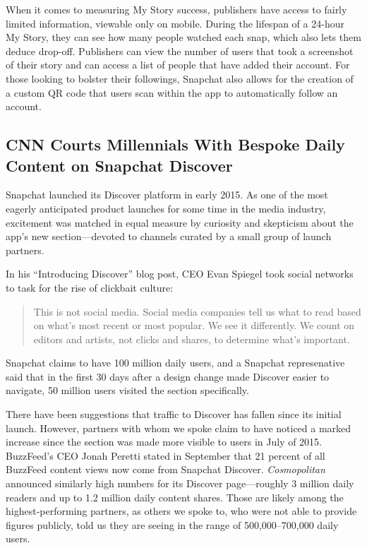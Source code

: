 \documentclass[notoc, symmetric, nobib, nols]{towcenter-guideto-book}
\begin{document}
When it comes to measuring My Story success, publishers have access to fairly limited information, viewable only on mobile. During the lifespan of a 24-hour My Story, they can see how many people watched each snap, which also lets them deduce drop-off. Publishers can view the number of users that took a screenshot of their story and can access a list of people that have added their account. For those looking to bolster their followings, Snapchat also allows for the creation of a custom QR code that users scan within the app to automatically follow an account.

\subsection{CNN Courts Millennials With Bespoke Daily Content on Snapchat Discover}

Snapchat launched its Discover platform in early 2015.\autocite{SnapchatDiscover} As one of the most eagerly anticipated product launches for some time in the media industry, excitement was matched in equal measure by curiosity and skepticism about the app's new section---devoted to channels curated by a small group of launch partners.

In his ``Introducing Discover'' blog post, CEO Evan Spiegel took social networks to task for the rise of clickbait culture: 

\begin{quote}
This is not social media. Social media companies tell us what to read based on what's most recent or most popular. We see it differently. We count on editors and artists, not clicks and shares, to determine what's important.\autocite{SnapchatDiscover}
\end{quote}

Snapchat claims to have 100 million daily users, and a Snapchat represenative said that in the first 30 days after a design change made Discover easier to navigate, 50 million users visited the section specifically.\autocite{DigidaySnapchat}

There have been suggestions that traffic to Discover has fallen since its initial launch. However, partners with whom we spoke claim to have noticed a marked increase since the section was made more visible to users in July of 2015. BuzzFeed's CEO Jonah Peretti stated in September that 21 percent of all BuzzFeed content views now come from Snapchat Discover.\autocite{RecodeBuzzfeed} \textit{Cosmopolitan} announced similarly high numbers for its Discover page---roughly 3 million daily readers and up to 1.2 million daily content shares.\autocite{DigidayCosmo} Those are likely among the highest-performing partners, as others we spoke to, who were not able to provide figures publicly, told us they are seeing in the range of 500,000--700,000 daily users. 
\end{document}
